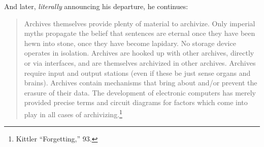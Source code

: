 \documentclass{tufte-handout}
\begin{document}
\noindent And later, \emph{literally} announcing his departure, he continues:

\begin{quote}
Archives themselves provide plenty of material to archivize. Only
imperial myths propagate the belief that sentences are eternal once they
have been hewn into stone, once they have become lapidary. No storage
device operates in isolation. Archives are hooked up with other
archives, directly or via interfaces, and are themselves archivized in
other archives. Archives require input and output stations (even if
these be just sense organs and brains). Archives contain mechanisms that
bring about and/or prevent the erasure of their data. The development of
electronic computers has merely provided precise terms and circuit
diagrams for factors which come into play in all cases of
archivizing.\footnote{Kittler ``Forgetting,'' 93.}
\end{quote}
\end{document}
